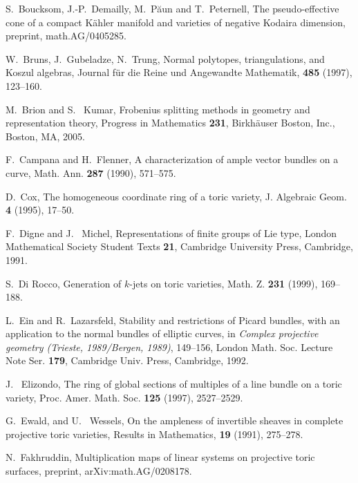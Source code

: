 \documentclass[12pt]{amsart}
\theoremstyle{definition}
\theoremstyle{remark}
\begin{document}
\providecommand{\bysame}{\leavevmode \hbox \o3em
{\hrulefill}\thinspace}
\begin{thebibliography}{BDPP}

S.~Boucksom, J.-P.~Demailly, M.~P\u{a}un and T.~Peternell, The
pseudo-effective cone of a compact K\"{a}hler manifold and varieties of
negative Kodaira dimension, preprint, math.AG/0405285.

W.~Bruns, J.~Gubeladze, N.~Trung,
        Normal polytopes, triangulations, and {K}oszul algebras,
        Journal f{\"u}r die Reine und Angewandte Mathematik, 
\textbf{485} (1997), 123--160. 

 M.~Brion and S.~ Kumar,  Frobenius splitting methods in geometry and representation theory, 
 Progress in Mathematics \textbf{231}, Birkh\"{a}user Boston, Inc., Boston, MA, 2005.

F.~Campana and H.~Flenner, A characterization of ample vector bundles on a curve,  Math. Ann.  \textbf{287}  (1990), 571--575.

D.~Cox,  The homogeneous coordinate ring of a toric variety,
 J. Algebraic Geom. \textbf{4} (1995),  17--50.

F.~Digne and J.~ Michel,  Representations of finite groups of Lie
type, London Mathematical Society Student Texts \textbf{21},
Cambridge University Press, Cambridge, 1991.

S.~Di Rocco, Generation of $k$-jets on toric varieties, Math. Z.
\textbf{231} (1999), 169--188.

L.~Ein and R.~Lazarsfeld, Stability and restrictions of Picard
bundles, with an application to the normal bundles of elliptic
curves, in \emph{Complex projective geometry (Trieste, 1989/Bergen,
1989)}, 149--156, London Math. Soc. Lecture Note Ser. \textbf{179},
Cambridge Univ. Press, Cambridge, 1992.

J.~ Elizondo, The ring of global sections of multiples of a line
bundle on a toric variety, Proc. Amer. Math. Soc. \textbf{125}
(1997), 2527--2529.

G.~Ewald, and U.~ Wessels,
On the ampleness of invertible sheaves in complete projective toric varieties, 
Results in Mathematics, \textbf{19} (1991), 275--278. 

N.~Fakhruddin, Multiplication maps of linear systems on projective toric surfaces, preprint,
arXiv:math.AG/0208178.


\end{thebibliography}
\end{document}
